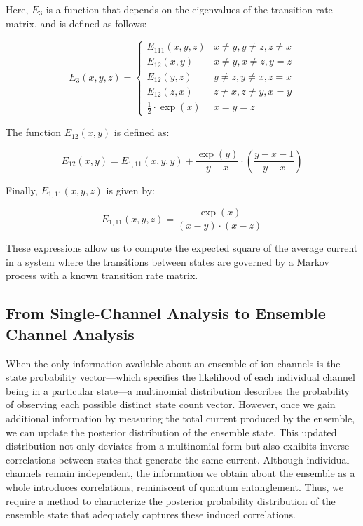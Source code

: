 \documentclass[pdflatex,sn-mathphys-num]{sn-jnl}%
\theoremstyle{thmstyleone}%
\theoremstyle{thmstyletwo}%
\theoremstyle{thmstylethree}%
\begin{document}
Here, \(E_3\) is a function that depends on the eigenvalues of the transition rate matrix, and is defined as follows:

\begin{equation}
	E_3(x,y,z)= 
	\begin{cases}
		E_{111}(x,y,z) & x\neq y, y\neq z, z\neq x \\
		E_{12}(x,y) & x\neq y, x\neq z, y = z \\
		E_{12}(y,z) & y\neq z, y\neq x, z = x \\
		E_{12}(z,x) & z\neq x, z\neq y, x = y \\
		\frac{1}{2} \cdot \exp(x) & x=y=z
	\end{cases}
\end{equation}

The function \(E_{12}(x, y)\) is defined as:

\begin{equation}
	E_{12}(x,y) = E_{1,11}(x, y, y) + \frac{\exp(y)}{y - x} \cdot \left(\frac{y - x - 1}{y - x}\right)
\end{equation}

Finally, \(E_{1,11}(x, y, z)\) is given by:

\begin{equation}
	E_{1,11}(x, y, z) = \frac{\exp(x)}{(x - y) \cdot (x - z)}
\end{equation}

These expressions allow us to compute the expected square of the average current in a system where the transitions between states are governed by a Markov process with a known transition rate matrix.








\subsection{From Single-Channel Analysis to Ensemble Channel Analysis}

When the only information available about an ensemble of ion channels is the state probability vector—which specifies the likelihood of each individual channel being in a particular state—a multinomial distribution describes the probability of observing each possible distinct state count vector. However, once we gain additional information by measuring the total current produced by the ensemble, we can update the posterior distribution of the ensemble state. This updated distribution not only deviates from a multinomial form but also exhibits inverse correlations between states that generate the same current. Although individual channels remain independent, the information we obtain about the ensemble as a whole introduces correlations, reminiscent of quantum entanglement. Thus, we require a method to characterize the posterior probability distribution of the ensemble state that adequately captures these induced correlations.
\end{document}
